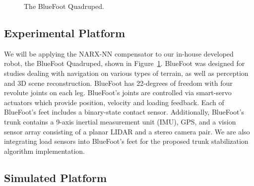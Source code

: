 
	\begin{figure}[t!]\centering
		\centering
		\caption{ The BlueFoot Quadruped.}
		\label{fig::bluefoot}
		\PostImageCloseSpace
	\end{figure}
\subsection{Experimental Platform}

We will be applying the NARX-NN compensator to our in-house developed robot, the BlueFoot Quadruped, shown in Figure~\ref{fig::bluefoot}. BlueFoot was designed for studies dealing with navigation on various types of terrain, as well as perception and 3D scene reconstruction. BlueFoot has 22-degrees of freedom with four revolute joints on each leg. BlueFoot's joints are controlled via smart-servo actuators which provide position, velocity and loading feedback. Each of BlueFoot's feet includes a binary-state contact sensor. Additionally, BlueFoot's trunk contains a 9-axis inertial measurement unit (IMU), GPS, and a vision sensor array consisting of a planar LIDAR and a stereo camera pair.
We are also integrating load sensors into BlueFoot's feet for the proposed trunk stabilization algorithm implementation. 



\subsection{Simulated Platform}

